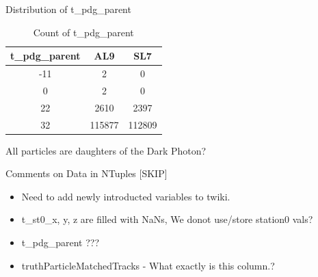 \begin{frame}{Distribution of t\_pdg\_parent}
    \begin{table}[h!]
        \centering
        \small
        \begin{tabular}{|c|c|c|}
        \hline
        t\_pdg\_parent  & AL9       & SL7       \\ \hline
        -11             & 2         & 0         \\
        0               & 2         & 0         \\
        22              & 2610      & 2397      \\
        32              & 115877    & 112809    \\ \hline
        \end{tabular}
        \caption{Count of t\_pdg\_parent}
        \label{table:truth_efficiency}
        All particles are daughters of the Dark Photon? 
    \end{table}
    
\end{frame}

\begin{frame}{Comments on Data in NTuples [SKIP]}
    \begin{itemize}
        \item Need to add newly introducted variables to twiki.
        \item t\_st0\_x, y, z are filled with NaNs, We donot use/store station0 vals?
        \item t\_pdg\_parent ???
        \item truthParticleMatchedTracks - What exactly is this column.?
    \end{itemize}
    
\end{frame}